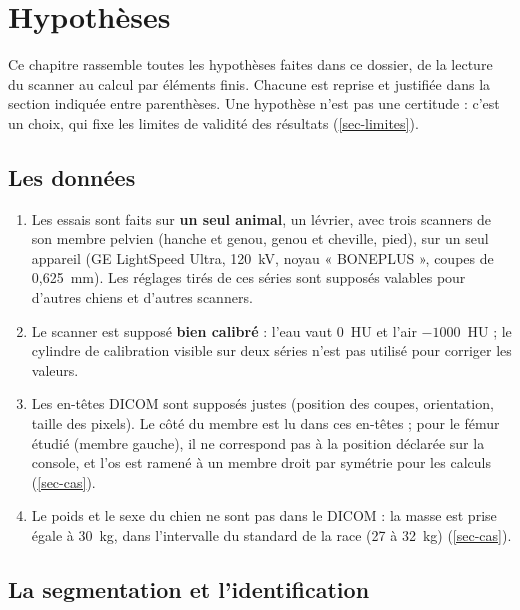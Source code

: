 \documentclass[11pt,a4paper]{article}
\begin{document}
\section{Hypothèses}
\label{sec-hypotheses}

Ce chapitre rassemble toutes les hypothèses faites dans ce dossier, de la lecture du scanner au calcul par éléments
finis. Chacune est reprise et justifiée dans la section indiquée entre parenthèses. Une hypothèse n'est pas une
certitude : c'est un choix, qui fixe les limites de validité des résultats (\cref{sec-limites}).

\subsection{Les données}

\begin{enumerate}[label=D\arabic*.]
  \item Les essais sont faits sur \textbf{un seul animal}, un lévrier, avec trois scanners de son membre pelvien
  (hanche et genou, genou et cheville, pied), sur un seul appareil (GE LightSpeed Ultra, 120~kV, noyau « BONEPLUS »,
  coupes de 0,625~mm). Les réglages tirés de ces séries sont supposés valables pour d'autres chiens et d'autres
  scanners.
  \item Le scanner est supposé \textbf{bien calibré} : l'eau vaut 0~HU et l'air $-1000$~HU ; le cylindre de calibration
  visible sur deux séries n'est pas utilisé pour corriger les valeurs.
  \item Les en-têtes DICOM sont supposés justes (position des coupes, orientation, taille des pixels). Le côté du
  membre est lu dans ces en-têtes ; pour le fémur étudié (membre gauche), il ne correspond pas à la position déclarée
  sur la console, et l'os est ramené à un membre droit par symétrie pour les calculs (\cref{sec-cas}).
  \item Le poids et le sexe du chien ne sont pas dans le DICOM : la masse est prise égale à 30~kg, dans l'intervalle
  du standard de la race (27 à 32~kg) \cite{ckc} (\cref{sec-cas}).
\end{enumerate}

\subsection{La segmentation et l'identification}
\end{document}
